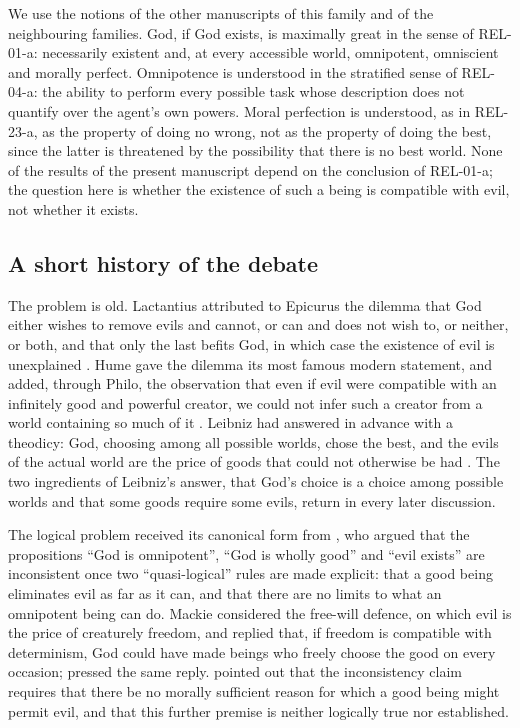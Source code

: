 \documentclass{situationist-preprint}
\begin{document}
We use the notions of the other manuscripts of this family and of the neighbouring families. God, if God exists, is maximally great in the sense of REL-01-a: necessarily existent and, at every accessible world, omnipotent, omniscient and morally perfect. Omnipotence is understood in the stratified sense of REL-04-a: the ability to perform every possible task whose description does not quantify over the agent's own powers. Moral perfection is understood, as in REL-23-a, as the property of doing no wrong, not as the property of doing the best, since the latter is threatened by the possibility that there is no best world. None of the results of the present manuscript depend on the conclusion of REL-01-a; the question here is whether the existence of such a being is compatible with evil, not whether it exists.

\subsection{A short history of the debate}

The problem is old. Lactantius attributed to Epicurus the dilemma that God either wishes to remove evils and cannot, or can and does not wish to, or neither, or both, and that only the last befits God, in which case the existence of evil is unexplained \citep[13]{Lactantius}. Hume gave the dilemma its most famous modern statement, and added, through Philo, the observation that even if evil were compatible with an infinitely good and powerful creator, we could not infer such a creator from a world containing so much of it \citep[X--XI]{Hume1779}. Leibniz had answered in advance with a theodicy: God, choosing among all possible worlds, chose the best, and the evils of the actual world are the price of goods that could not otherwise be had \citep{Leibniz1710}. The two ingredients of Leibniz's answer, that God's choice is a choice among possible worlds and that some goods require some evils, return in every later discussion.

The logical problem received its canonical form from \citet{Mackie1955}, who argued that the propositions \enquote{God is omnipotent}, \enquote{God is wholly good} and \enquote{evil exists} are inconsistent once two \enquote{quasi-logical} rules are made explicit: that a good being eliminates evil as far as it can, and that there are no limits to what an omnipotent being can do. Mackie considered the free-will defence, on which evil is the price of creaturely freedom, and replied that, if freedom is compatible with determinism, God could have made beings who freely choose the good on every occasion; \citet{Flew1955} pressed the same reply. \citet{Pike1963} pointed out that the inconsistency claim requires that there be no morally sufficient reason for which a good being might permit evil, and that this further premise is neither logically true nor established.
\end{document}
